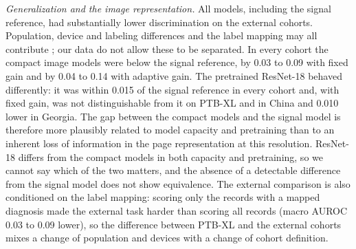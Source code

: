 \documentclass{wlscirep}
\begin{document}
\emph{Generalization and the image representation.} All models, including the signal reference, had substantially lower discrimination on the external cohorts. Population, device and labeling differences and the label mapping may all contribute \cite{reyna2022issues}; our data do not allow these to be separated. In every cohort the compact image models were below the signal reference, by 0.03 to 0.09 with fixed gain and by 0.04 to 0.14 with adaptive gain. The pretrained ResNet-18 behaved differently: it was within 0.015 of the signal reference in every cohort and, with fixed gain, was not distinguishable from it on PTB-XL and in China and 0.010 lower in Georgia. The gap between the compact models and the signal model is therefore more plausibly related to model capacity and pretraining than to an inherent loss of information in the page representation at this resolution. ResNet-18 differs from the compact models in both capacity and pretraining, so we cannot say which of the two matters, and the absence of a detectable difference from the signal model does not show equivalence. The external comparison is also conditioned on the label mapping: scoring only the records with a mapped diagnosis made the external task harder than scoring all records (macro AUROC 0.03 to 0.09 lower), so the difference between PTB-XL and the external cohorts mixes a change of population and devices with a change of cohort definition.
\end{document}
